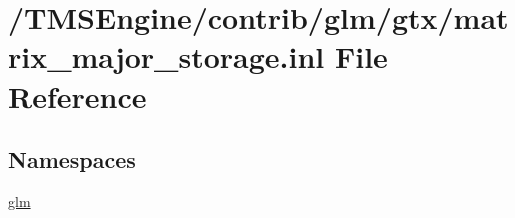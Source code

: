 \hypertarget{matrix__major__storage_8inl}{}\section{/\+T\+M\+S\+Engine/contrib/glm/gtx/matrix\+\_\+major\+\_\+storage.inl File Reference}
\label{matrix__major__storage_8inl}
\subsection*{Namespaces}
\begin{DoxyCompactItemize}
\item 
 \hyperlink{namespaceglm}{glm}
\end{DoxyCompactItemize}
